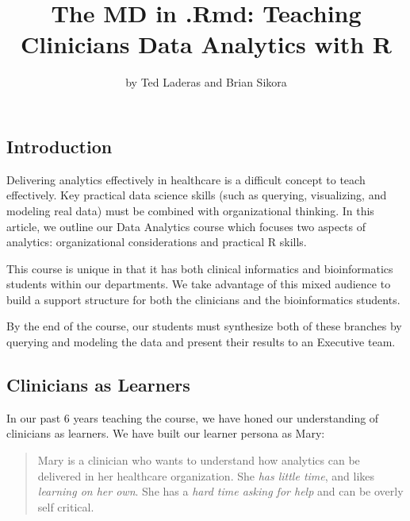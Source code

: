 \title{The MD in .Rmd: Teaching Clinicians Data Analytics with R}
\author{by Ted Laderas and Brian Sikora}

\maketitle


\hypertarget{introduction}{%
\subsection{Introduction}\label{introduction}}

Delivering analytics effectively in healthcare is a difficult concept to
teach effectively. Key practical data science skills (such as querying,
visualizing, and modeling real data) must be combined with
organizational thinking. In this article, we outline our Data Analytics
course which focuses two aspects of analytics: organizational
considerations and practical R skills.

This course is unique in that it has both clinical informatics and
bioinformatics students within our departments. We take advantage of
this mixed audience to build a support structure for both the clinicians
and the bioinformatics students.

By the end of the course, our students must synthesize both of these
branches by querying and modeling the data and present their results to
an Executive team.

\hypertarget{clinicians-as-learners}{%
\subsection{Clinicians as Learners}\label{clinicians-as-learners}}

In our past 6 years teaching the course, we have honed our understanding
of clinicians as learners. We have built our learner persona as Mary:

\begin{quote}
Mary is a clinician who wants to understand how analytics can be
delivered in her healthcare organization. She \emph{has little time},
and likes \emph{learning on her own}. She has a \emph{hard time asking
for help} and can be overly self critical.
\end{quote}

